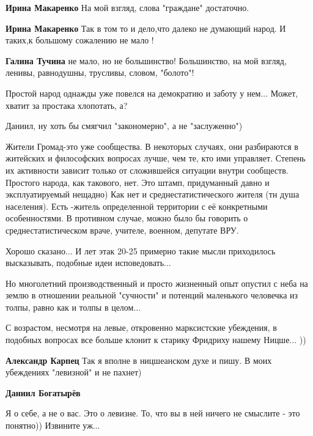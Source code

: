 \begin{itemize}
\begin{itemize}
\textbf{Ирина Макаренко} На мой взгляд, слова "граждане" достаточно.

\textbf{Ирина Макаренко} Так в том то и дело,что далеко не думающий народ. И таких,к большому сожалению не мало !

\textbf{Галина Тучина} не мало, но не большинство!
Большинство, на мой взгляд, ленивы, равнодушны, трусливы, словом, "болото"!
\end{itemize} %


Простой народ однажды уже повелся на демократию и заботу у нем... Может, хватит за простака хлопотать, а?


Даниил, ну хоть бы смягчил "закономерно", а не "заслуженно")


Жители Громад-это уже сообщества. В некоторых случаях, они разбираются в
житейских и философских вопросах лучше, чем те, кто ими управляет. Степень их
активности зависит только от сложившейся ситуации внутри сообществ. Простого
народа, как такового, нет. Это штамп, придуманный давно и эксплуатируемый
нещадно) Как нет и среднестатистического жителя (тн душа населения). Есть
-житель определенной территории с её конкретными особенностями. В противном
случае, можно было бы говорить о среднестатистическом враче, учителе, военном,
депутате ВРУ.


Хорошо сказано... И лет этак 20-25 примерно такие мысли приходилось
высказывать, подобные идеи исповедовать...

Но многолетний производственный и просто жизненный опыт опустил с неба на землю
в отношении реальной "сучности" и потенций маленького человечка из толпы, равно
как и толпы в целом...

С возрастом, несмотря на левые, откровенно марксистские убеждения, в подобных
вопросах все больше клонит к старику Фридриху нашему Ницше... ))

\begin{itemize} %
\textbf{Александр Карпец} Так я вполне в ницшеанском духе и пишу. В моих убеждениях "левизной" и не пахнет)

\textbf{Даниил Богатырёв} 

Я о себе, а не о вас. Это о левизне. То, что вы в ней ничего не смыслите - это
понятно)) Извините уж...


\end{itemize}
\end{itemize}
